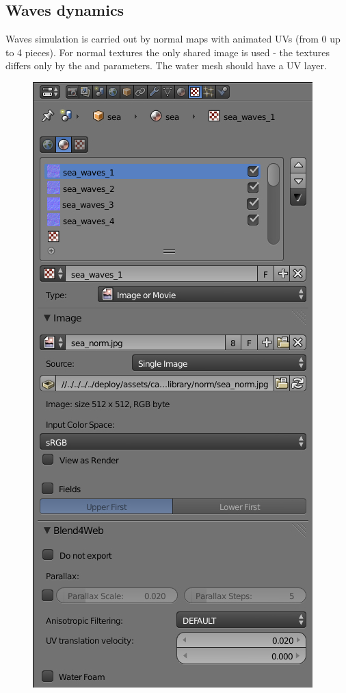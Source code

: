 \documentclass[a4paper,12pt,oneside]{sphinxmanual}
\begin{document}
\subsection{Waves dynamics}
\label{outdoor_rendering:id5}
Waves simulation is carried out by normal maps with animated UVs (from 0 up to 4 pieces). For normal textures the only shared image is used - the textures differs only by the  and  parameters. The water mesh should have a UV layer.
\begin{figure}[htbp]
\centering

\includegraphics[width=0.700\linewidth]{water_texture_setup_normal.jpg}
\end{figure}
\end{document}
